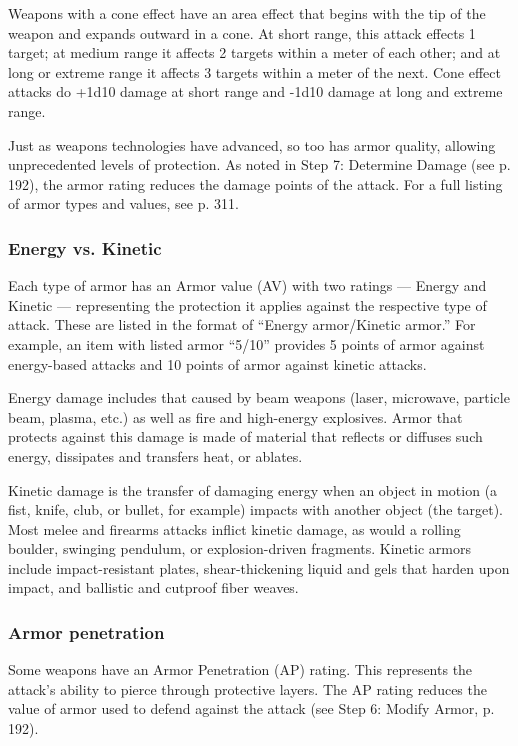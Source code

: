 Weapons with a cone effect have an area effect that begins with the tip of the weapon and expands outward in a cone. At short range, this attack effects 1 target; at medium range it affects 2 targets within a meter of each other; and at long or extreme range it affects 3 targets within a meter of the next. Cone effect attacks do +1d10 damage at short range and -1d10 damage at long and extreme range.


\label{sec:combat-armor}

Just as weapons technologies have advanced, so too has armor quality, allowing unprecedented levels of protection. As noted in Step 7: Determine Damage (see p. 192), the armor rating reduces the damage points of the attack. For a full listing of armor types and values, see p. 311.

\subsubsection{Energy vs. Kinetic}

Each type of armor has an Armor value (AV) with two ratings --- Energy and Kinetic --- representing the protection it applies against the respective type of attack. These are listed in the format of ``Energy armor/Kinetic armor.'' For example, an item with listed armor ``5/10'' provides 5 points of armor against energy-based attacks and 10 points of armor against kinetic attacks.

Energy damage includes that caused by beam weapons (laser, microwave, particle beam, plasma, etc.) as well as fire and high-energy explosives. Armor that protects against this damage is made of material that reflects or diffuses such energy, dissipates and transfers heat, or ablates.

Kinetic damage is the transfer of damaging energy when an object in motion (a fist, knife, club, or bullet, for example) impacts with another object (the target). Most melee and firearms attacks inflict kinetic damage, as would a rolling boulder, swinging pendulum, or explosion-driven fragments. Kinetic armors include impact-resistant plates, shear-thickening liquid and gels that harden upon impact, and ballistic and cutproof fiber weaves.

\subsubsection{Armor penetration}

Some weapons have an Armor Penetration (AP) rating. This represents the attack’s ability to pierce through protective layers. The AP rating reduces the value of armor used to defend against the attack (see Step 6: Modify Armor, p. 192).


